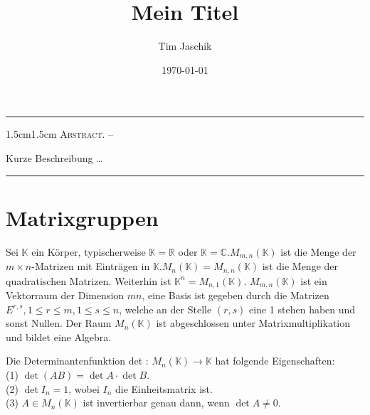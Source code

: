 \documentclass[10pt, letterpaper]{article}
\title{Mein Titel}
\author{Tim Jaschik}
\date{\today}
\renewenvironment{abstract}
  {
    \begin{adjustwidth}{1.5cm}{1.5cm}
    \small
    \textsc{Abstract. –}%
  }
  {
    \end{adjustwidth}
  }
\begin{document}
\maketitle
\rule{\textwidth}{0.5pt}
\begin{abstract}
Kurze Beschreibung …
\end{abstract}
\rule{\textwidth}{0.5pt}
\vspace{0.5cm}

\tableofcontents

\pagebreak

\section{Matrixgruppen}



Sei $\mathbb{K}$ ein Körper, typischerweise $\mathbb{K}=\mathbb{R}$ oder $\mathbb{K}=\mathbb{C} . M_{m, n}(\mathbb{K})$ ist die Menge der $m \times n$-Matrizen mit Einträgen in $\mathbb{K} . M_{n}(\mathbb{K})=M_{n, n}(\mathbb{K})$ ist die Menge der quadratischen Matrizen. Weiterhin ist $\mathbb{K}^{n}=M_{n, 1}(\mathbb{K})$. $M_{m, n}(\mathbb{K})$ ist ein Vektorraum der Dimension $m n$, eine Basis ist gegeben durch die Matrizen $E^{r, s}, 1 \leq r \leq m, 1 \leq s \leq n$, welche an der Stelle $(r, s)$ eine 1 stehen haben und sonst Nullen. Der Raum $M_{n}(\mathbb{K})$ ist abgeschlossen unter Matrixmultiplikation und bildet eine Algebra.

Die Determinantenfunktion det : $M_{n}(\mathbb{K}) \rightarrow \mathbb{K}$ hat folgende Eigenschaften:\\
(1) $\operatorname{det}(A B)=\operatorname{det} A \cdot \operatorname{det} B$.\\
(2) $\operatorname{det} I_{n}=1$, wobei $I_{n}$ die Einheitsmatrix ist.\\
(3) $A \in M_{n}(\mathbb{K})$ ist invertierbar genau dann, wenn $\operatorname{det} A \neq 0$.
\end{document}
